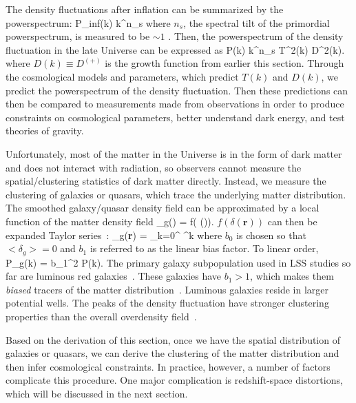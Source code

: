 The density fluctuations after inflation can be summarized by the powerspectrum: 
\beq
P_{\rm inf}(k) \propto k^{n_s}
\eeq
where $n_s$, the spectral tilt of the primordial powerspectrum, is measured to be 
$\sim 1$ \citep{Harrison:1970aa, Peebles:1970, Zeldovich:1972, Komatsu:2011aa}.
Then, the powerspectrum of the density fluctuation in the late Universe can be 
expressed as 
\beq
P(k) \propto k^{n_s} \; T^2(k) \; D^2(k).
\eeq
where $D(k) \equiv D^{(+)}$ is the growth function from earlier this section. 
Through the cosmological models and parameters, which predict 
$T(k)$ and $D(k)$, we predict the powerspectrum of the density fluctuation. Then 
these predictions can then be compared to measurements made from observations in 
order to produce constraints on cosmological parameters, better understand dark 
energy, and test theories of gravity. 

Unfortunately, most of the matter in the Universe is in the form of dark 
matter and does not interact with radiation, so observers cannot measure the 
spatial/clustering statistics of dark matter directly. 
Instead, we measure the clustering of galaxies or quasars, which trace
the underlying matter distribution. The smoothed galaxy/quasar density field 
can be  approximated by a local function of the matter density field
\beq
\delta_g() = f( \delta()). 
\eeq
$f(\delta(\bm{r}))$ can then be expanded Taylor series~\citep{Fry:1993}:
\beq
\delta_g({\bf r}) = \sum\limits_{k=0}^{\infty}  \delta^k 
\eeq
where $b_0$ is chosen so that $<\delta_g> = 0$ and $b_1$ is referred to as 
the linear bias factor. To linear order, 
\beq
P_g(k) = b_1^2 P(k). 
\eeq
The primary galaxy subpopulation used in LSS studies so far are luminous 
red galaxies~\citep{Eisenstein:2001aa, Dawson:2013aa}. These galaxies have $b_1 > 1$,
which makes them {\em biased} tracers of the matter 
distribution~\citep{Zehavi:2005aa, Sheldon:2009aa,Gaztanaga:2009aa, Zhai:2016aa}.
Luminous galaxies reside in larger potential wells. The peaks of the density fluctuation
have stronger clustering properties than the overall overdensity field~\citep{Manera:2010aa}.

Based on the derivation of this section, once we have the spatial 
distribution of galaxies or quasars, we can derive the clustering of the matter
distribution and then infer cosmological constraints. In practice, however, a
number of factors complicate this procedure. One major complication is redshift-space
distortions, which will be discussed in the next section.

